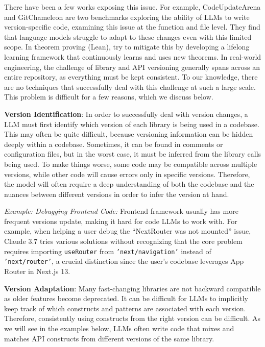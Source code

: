 There have been a few works exposing this issue. For example, CodeUpdateArena \citep{liu2024codeupdatearena} and GitChameleon \citep{islah2024gitchameleon} are two benchmarks exploring the ability of LLMs to write version-specific code, examining this issue at the function and file level. They find that language models struggle to adapt to these changes even with this limited scope. In theorem proving (Lean), \citet{kumarappan2024leanagent} try to mitigate this by developing a lifelong learning framework that continuously learns and uses new theorems. In real-world engineering, the challenge of library and API versioning generally spans across an entire repository, as everything must be kept consistent. To our knowledge, there are no techniques that successfully deal with this challenge at such a large scale. This problem is difficult for a few reasons, which we discuss below. 

\textbf{Version Identification}: In order to successfully deal with version changes, a LLM must first identify which version of each library is being used in a codebase. This may often be quite difficult, because versioning information can be hidden deeply within a codebase. Sometimes, it can be found in comments or configuration files, but in the worst case, it must be inferred from the library calls being used. To make things worse, some code may be compatible across multiple versions, while other code will cause errors only in specific versions. Therefore, the model will often require a deep understanding of both the codebase and the nuances between different versions in order to infer the version at hand.

\begin{tcolorbox}[colback=lightblue, boxrule=0pt, arc=5pt, outer arc=5pt, after skip=10pt plus 2pt]
\textit{Example: Debugging Frontend Code:} Frontend framework usually has more frequent versions update, making it hard for code LLMs to work with. For example, when helping a user debug the ``NextRouter was not mounted'' issue, Claude 3.7 tries various solutions without recognizing that the core problem requires importing \texttt{useRouter} from \texttt{'next/navigation'} instead of \texttt{'next/router'}, a crucial distinction since the user's codebase leverages App Router in Next.js 13.
\end{tcolorbox}


\textbf{Version Adaptation}: Many fast-changing libraries are not backward compatible as older features become deprecated. It can be difficult for LLMs to implicitly keep track of which constructs and patterns are associated with each version. Therefore, consistently using constructs from the right version can be difficult. As we will see in the examples below, LLMs often write code that mixes and matches API constructs from different versions of the same library. 


